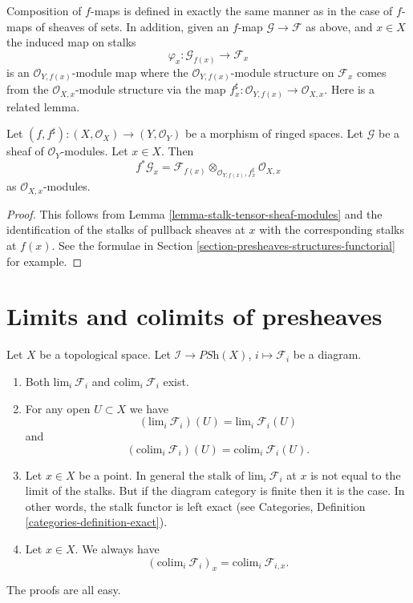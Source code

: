 \medskip\noindent
Composition of $f$-maps is defined in exactly the
same manner as in the case of $f$-maps of sheaves of
sets. In addition, given an $f$-map $\mathcal{G} \to \mathcal{F}$
as above, and $x \in X$ the induced map on stalks
$$
\varphi_x : \mathcal{G}_{f(x)} \longrightarrow \mathcal{F}_x
$$
is an $\mathcal{O}_{Y,f(x)}$-module map where the
$\mathcal{O}_{Y,f(x)}$-module structure on $\mathcal{F}_x$
comes from the $\mathcal{O}_{X,x}$-module structure via
the map $f^\sharp_x : \mathcal{O}_{Y,f(x)} \to \mathcal{O}_{X,x}$.
Here is a related lemma.

\begin{lemma}
\label{lemma-stalk-pullback-modules}
Let $(f, f^\sharp) : (X, \mathcal{O}_X) \to (Y, \mathcal{O}_Y)$
be a morphism of ringed spaces.
Let $\mathcal{G}$ be a sheaf of $\mathcal{O}_Y$-modules.
Let $x \in X$. Then
$$
f^*\mathcal{G}_x =
\mathcal{F}_{f(x)}
\otimes_{\mathcal{O}_{Y, f(x)}, f^\sharp_x}
\mathcal{O}_{X, x}
$$
as $\mathcal{O}_{X,x}$-modules.
\end{lemma}

\begin{proof}
This follows from Lemma \ref{lemma-stalk-tensor-sheaf-modules}
and the identification of the stalks of pullback sheaves
at $x$ with the corresponding stalks at $f(x)$. See the
formulae in Section \ref{section-presheaves-structures-functorial}
for example.
\end{proof}










\section{Limits and colimits of presheaves}
\label{section-limits-presheaves}

\noindent
Let $X$ be a topological space.
Let $\mathcal{I} \to \textit{PSh}(X)$, $i \mapsto \mathcal{F}_i$
be a diagram.
\begin{enumerate}
\item Both $\text{lim}_i\ \mathcal{F}_i$ and $\text{colim}_i\ \mathcal{F}_i$
exist.
\item For any open $U \subset X$ we have
$$
(\text{lim}_i\ \mathcal{F}_i)(U) = \text{lim}_i\ \mathcal{F}_i(U)
$$
and
$$
(\text{colim}_i\ \mathcal{F}_i)(U) =
\text{colim}_i\ \mathcal{F}_i(U).
$$
\item Let $x \in X$ be a point. In general the stalk of
$\text{lim}_i\ \mathcal{F}_i$ at $x$ is not equal to
the limit of the stalks. But if the diagram category is finite
then it is the case. In other words, the stalk functor is
left exact (see Categories, Definition \ref{categories-definition-exact}).
\item Let $x \in X$. We always have
$$
(\text{colim}_i\ \mathcal{F}_i)_x =
\text{colim}_i\ \mathcal{F}_{i,x}.
$$
\end{enumerate}
The proofs are all easy.

